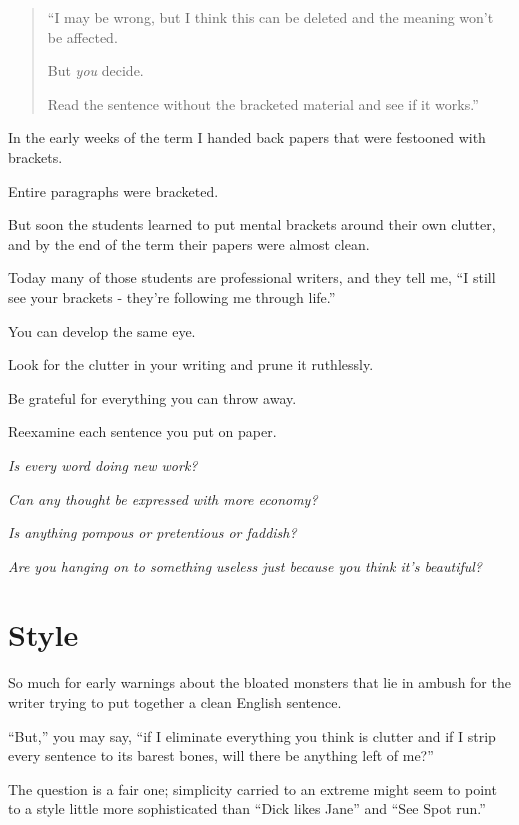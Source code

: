 \documentclass{book}
\numberwithin{equation}{section}
\begin{document}
\begin{quotation}
    ``I may be wrong, but I think this can be deleted and the meaning won't be affected.
    
    But \textit{you} decide.
    
    Read the sentence without the bracketed material and see if it works.''
\end{quotation}
In the early weeks of the term I handed back papers that were festooned with brackets.

Entire paragraphs were bracketed.

But soon the students learned to put mental brackets around their own clutter, and by the end of the term their papers were almost clean.

Today many of those students are professional writers, and they tell me, ``I still see your brackets - they're following me through life.''

%
You can develop the same eye.

Look for the clutter in your writing and prune it ruthlessly.

Be grateful for everything you can throw away.

Reexamine each sentence you put on paper.

\textit{Is every word doing new work?}

\textit{Can any thought be expressed with more economy?}

\textit{Is anything pompous or pretentious or faddish?}

\textit{Are you hanging on to something useless just because you think it's beautiful?}



\chapter{Style}

So much for early warnings about the bloated monsters that lie in ambush for the writer trying to put together a clean English sentence.

%
``But,'' you may say, ``if I eliminate everything you think is clutter and if I strip every sentence to its barest bones, will there be anything left of me?''

The question is a fair one; simplicity carried to an extreme might seem to point to a style little more sophisticated than ``Dick likes Jane'' and ``See Spot run.''
\end{document}
